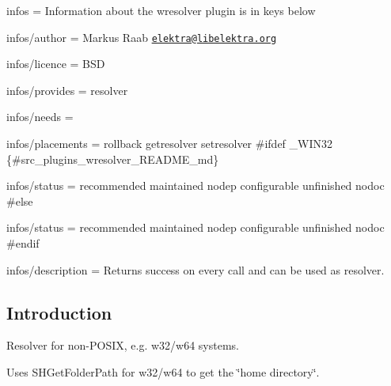
\begin{DoxyItemize}
\item infos = Information about the wresolver plugin is in keys below
\item infos/author = Markus Raab \href{mailto:elektra@libelektra.org}{\tt elektra@libelektra.\+org}
\item infos/licence = B\+SD
\item infos/provides = resolver
\item infos/needs =
\item infos/placements = rollback getresolver setresolver \#ifdef \+\_\+\+W\+I\+N32 \{\#src\+\_\+plugins\+\_\+wresolver\+\_\+\+R\+E\+A\+D\+M\+E\+\_\+md\}
\item infos/status = recommended maintained nodep configurable unfinished nodoc \#else
\item infos/status = recommended maintained nodep configurable unfinished nodoc \#endif
\item infos/description = Returns success on every call and can be used as resolver.
\end{DoxyItemize}

\subsection*{Introduction}

Resolver for non-\/\+P\+O\+S\+IX, e.\+g. w32/w64 systems.

Uses S\+H\+Get\+Folder\+Path for w32/w64 to get the \char`\"{}home directory\char`\"{}. 